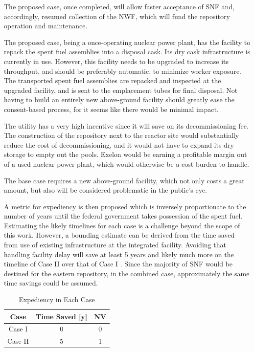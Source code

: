 The proposed case, once completed, will allow faster acceptance of \gls{SNF} and, 
accordingly, resumed collection of the \gls{NWF}, 
which will fund the repository operation and maintenance.

The proposed case, being a once-operating nuclear power plant, has the facility to 
repack the spent fuel assemblies into a disposal cask. Its dry cask infrastructure 
is currently in use. However, this facility needs to be upgraded to increase its throughput, and should be preferably automatic, to minimize worker exposure. The transported spent fuel assemblies are repacked and inspected at the upgraded facility, and is sent to the emplacement tubes for final disposal. Not having to build an entirely new above-ground facility should greatly ease the consent-based process, for it seems like there would be minimal impact. 
 
The utility has a very high incentive since it will save on its decommissioning fee.
The construction of the repository next to the reactor site would substantially
reduce the cost of decommissioning, and it would not have to expand its dry storage
to empty out the pools. Exelon would be earning a profitable margin out of a
used nuclear power plant, which would otherwise be a cost burden to handle.

The base case requires a new above-ground facility, which not only costs a great
amount, but also will be considered problematic in the public's eye. 

A metric for expediency is then proposed which is inversely proportionate to 
the number of years until the federal government takes possession of the spent 
fuel. Estimating the likely timelines for each case is a challenge beyond the 
scope of this work. However, a bounding estimate can be derived from the time 
saved from use of existing infrastructure at the integrated facility. Avoiding 
that handling facility delay will save at least 5 years 
and likely much more on the timeline of Case II over that of Case I 
\cite{doe_strategy_2013}. Since the 
majority of \gls{SNF} would be destined for the eastern repository, in the combined case,
 approximately the same time savings could be assumed.

\begin{table}[h]
	\centering
        \caption {Expediency in Each Case}
		\begin{tabular}{|c|c|c|}
			\hline
                        Case & Time Saved [y] & NV \\
			\hline
			Case I & 0 & 0\\
			Case II & 5 & 1 \\
			\hline
                \end{tabular}
\end{table}

